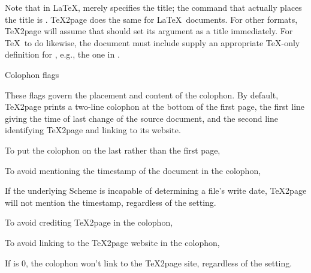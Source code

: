 
\n Note that in \LaTeX, \p{\title} merely
specifies the title; the command that actually places the
title is \p{\maketitle}.  \TeX2page does the same for \LaTeX\
documents.  For other formats, \TeX2page will assume that
\p{\title}  should set its argument as a title immediately.
For \TeX\ to do likewise, the document must include supply an
appropriate \TeX-only definition for \p{\title}, e.g., the
one in .

\beginsection Colophon flags

These flags
govern the placement and content of the colophon.
By default, \TeX2page prints a two-line colophon at the
bottom of the first page, the first line giving
the time of last change of the source document, and the
second line identifying \TeX2page and linking to its website.

To put the colophon on the last rather than the first page,


\iffalse
\n If this request is to have meaning, it should be made in the document
before the text for the second HTML page starts.  Otherwise, the default
first-page placement of the colophon will have already taken effect.
\fi

To avoid mentioning the timestamp of the document in the
colophon,


\n If the underlying
Scheme is incapable of determining a file’s write date, \TeX2page will
not mention the timestamp, regardless of the \p{\TZPcolophontimestamp} setting.

To avoid crediting \TeX2page in the colophon,


To avoid linking to the \TeX2page website in the colophon,


\n If \p{\TZPcolophoncredit} is 0, the colophon won’t link to the \TeX2page
site, regardless of the \p{\TZPcolophonweblink} setting.

